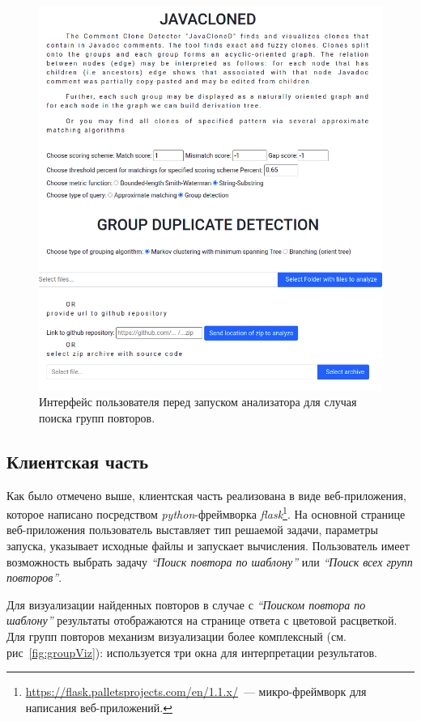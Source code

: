\begin{figure}[h!]
    \centering
    \includegraphics[width=\columnwidth]{Mishin/figures/startApp.png}
    \caption{Интерфейс пользователя перед запуском анализатора для случая поиска групп повторов.}\label{fig:startApp}
\end{figure}

\subsection{Клиентская часть}\label{clinet}
Как было отмечено выше, клиентская часть реализована в виде веб-приложения, которое написано посредством \emph{python}-фреймворка \emph{flask}\footnote{\url{https://flask.palletsprojects.com/en/1.1.x/}~--- микро-фрейм\-ворк для написания веб-приложений.}.
На основной странице веб-приложения пользователь выставляет тип решаемой задачи, параметры запуска, указывает исходные файлы и запускает вычисления.
Пользователь имеет возможность выбрать задачу \emph{``Поиск повтора по шаблону''} или \emph{``Поиск всех групп повторов''}.

Для визуализации найденных повторов в случае с  \emph{``Поиском повтора по шаблону''} результаты отображаются на странице ответа с цветовой расцветкой.
Для групп повторов механизм визуализации более комплексный (см. рис~\ref{fig:groupViz}): используется три окна для интерпретации результатов.

